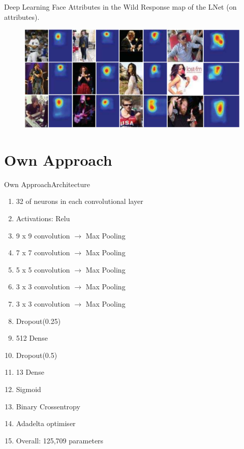 \documentclass{beamer}
\begin{document}
\begin{frame}{Deep Learning Face Attributes in the Wild}{\cite{liu2015faceattributes}}
	\centering
	Response map of the LNet (on attributes).
	\begin{figure}
			\centering
			\includegraphics[width=\linewidth]{figures/response}
			\label{fig:response}
	\end{figure}
\end{frame}

\section{Own Approach}
\begin{frame}{Own Approach}{Architecture}
	\begin{enumerate}
			\item 	32 of neurons in each convolutional layer
			\item Activations: Relu
			\item 9 x 9 convolution $\rightarrow$ Max Pooling
			\item	7 x 7 convolution $\rightarrow$  Max Pooling
			\item	5 x 5 convolution $\rightarrow$  Max Pooling
			\item	3 x 3 convolution $\rightarrow$  Max Pooling
			\item	3 x 3 convolution $\rightarrow$  Max Pooling
			\item	Dropout(0.25)
			\item	512 Dense
			\item	Dropout(0.5)
			\item	13 Dense
			\item	Sigmoid
			\item	Binary Crossentropy
			\item	Adadelta optimiser
			\item Overall: 125,709 parameters
	\end{enumerate}
\end{frame}
\end{document}
